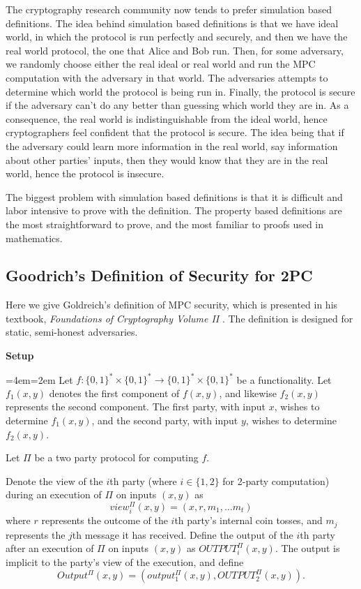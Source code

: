 \documentclass[12pt,twoside]{reedthesis}
\newenvironment{blockquote}{%
  \par%
  \medskip
  \leftskip=4em\rightskip=2em%
  \noindent\ignorespaces}{%
  \par\medskip}
\begin{document}
The cryptography research community now tends to prefer simulation based definitions. 
The idea behind simulation based definitions is that we have ideal world, in which the protocol is run perfectly and securely, and then we have the real world protocol, the one that Alice and Bob run. 
Then, for some adversary, we randomly choose either the real ideal or real world and run the MPC computation with the adversary in that world.
The adversaries attempts to determine which world the protocol is being run in.
Finally, the protocol is secure if the adversary can't do any better than guessing which world they are in.
As a consequence, the real world is indistinguishable from the ideal world, hence cryptographers feel confident that the protocol is secure. 
The idea being that if the adversary could learn more information in the real world, say information about other parties' inputs, then they would know that they are in the real world, hence the protocol is insecure. 

The biggest problem with simulation based definitions is that it is difficult and labor intensive to prove with the definition.
The property based definitions are the most straightforward to prove, and the most familiar to proofs used in mathematics.


\subsection{Goodrich's Definition of Security for 2PC}
Here we give Goldreich's definition of MPC security, which is presented in his textbook, \textit{Foundations of Cryptography Volume II} \cite{goldreich_vol2}. 
The definition is designed for static, semi-honest adversaries. 

\textbf{Setup} 
\begin{blockquote}
Let $f: \{0,1\}^* \times \{0,1\}^* \to \{0,1\}^* \times \{0,1\}^*$ be a functionality.
Let $f_1(x,y)$ denotes the first component of $f(x,y)$, and likewise $f_2(x,y)$ represents the second component.
The first party, with input $x$, wishes to determine $f_1(x,y)$, and the second party, with input $y$, wishes to determine $f_2(x,y)$.

Let $\Pi$ be a two party protocol for computing $f$.

Denote the view of the $i$th party (where $i \in \{1,2\}$ for 2-party computation) during an execution of $\Pi$ on inputs $(x,y)$ as $$view^{\Pi}_i(x,y) = (x,r,m_1, \ldots m_t)$$ where $r$ represents the outcome of the $i$th party's internal coin tosses, and $m_j$ represents the $j$th message it has received.
Define the output of the $i$th party after an execution of $\Pi$ on inputs $(x,y)$ as $OUTPUT^{\Pi}_i(x,y)$. 
The output is implicit to the party's view of the execution, and define 
$$Output^{\Pi}(x,y) = (output^{\Pi}_1(x,y), OUTPUT^{\Pi}_2(x,y)).$$
\end{blockquote}
\end{document}
